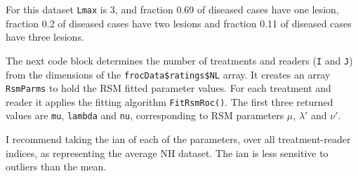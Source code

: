 \documentclass[
]{book}
\newenvironment{Shaded}{\begin{snugshade}}{\end{snugshade}}
\newcommand{\AttributeTok}[1]{\textcolor[rgb]{0.77,0.63,0.00}{#1}}
\newcommand{\CommentTok}[1]{\textcolor[rgb]{0.56,0.35,0.01}{\textit{#1}}}
\newcommand{\ControlFlowTok}[1]{\textcolor[rgb]{0.13,0.29,0.53}{\textbf{#1}}}
\newcommand{\DecValTok}[1]{\textcolor[rgb]{0.00,0.00,0.81}{#1}}
\newcommand{\FunctionTok}[1]{\textcolor[rgb]{0.00,0.00,0.00}{#1}}
\newcommand{\NormalTok}[1]{#1}
\newcommand{\OtherTok}[1]{\textcolor[rgb]{0.56,0.35,0.01}{#1}}
\newcommand{\SpecialCharTok}[1]{\textcolor[rgb]{0.00,0.00,0.00}{#1}}
\begin{document}
For this dataset \texttt{Lmax} is 3, and fraction 0.69 of diseased cases have one lesion, fraction 0.2 of diseased cases have two lesions and fraction 0.11 of diseased cases have three lesions.

The next code block determines the number of treatments and readers (\texttt{I} and \texttt{J}) from the dimensions of the \texttt{frocData\$ratings\$NL} array. It creates an array \texttt{RsmParms} to hold the RSM fitted parameter values. For each treatment and reader it applies the fitting algorithm \texttt{FitRsmRoc()}. The first three returned values are \texttt{mu}, \texttt{lambda} and \texttt{nu}, corresponding to RSM parameters \({\mu}\), \({\lambda'}\) and \({\nu'}\).

\begin{Shaded}
\end{Shaded}

I recommend taking the ian of each of the parameters, over all treatment-reader indices, as representing the average NH dataset. The ian is less sensitive to outliers than the mean.
\end{document}
